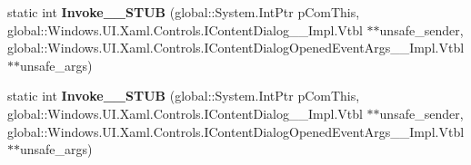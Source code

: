 \begin{DoxyCompactItemize}
\mbox{\label{struct_windows_1_1_foundation_1_1_typed_event_handler___a___windows___u_i___xaml___controls___co7eff74cfd44b375ec88a14fae1c258be_aa06d401f175726b3933a91c4a9d22514}} 
static int {\bfseries Invoke\+\_\+\+\_\+\+S\+T\+UB} (global\+::\+System.\+Int\+Ptr p\+Com\+This, global\+::\+Windows.\+U\+I.\+Xaml.\+Controls.\+I\+Content\+Dialog\+\_\+\+\_\+\+Impl.\+Vtbl $\ast$$\ast$unsafe\+\_\+sender, global\+::\+Windows.\+U\+I.\+Xaml.\+Controls.\+I\+Content\+Dialog\+Opened\+Event\+Args\+\_\+\+\_\+\+Impl.\+Vtbl $\ast$$\ast$unsafe\+\_\+args)
\item 
\mbox{\label{struct_windows_1_1_foundation_1_1_typed_event_handler___a___windows___u_i___xaml___controls___co7eff74cfd44b375ec88a14fae1c258be_aa06d401f175726b3933a91c4a9d22514}} 
static int {\bfseries Invoke\+\_\+\+\_\+\+S\+T\+UB} (global\+::\+System.\+Int\+Ptr p\+Com\+This, global\+::\+Windows.\+U\+I.\+Xaml.\+Controls.\+I\+Content\+Dialog\+\_\+\+\_\+\+Impl.\+Vtbl $\ast$$\ast$unsafe\+\_\+sender, global\+::\+Windows.\+U\+I.\+Xaml.\+Controls.\+I\+Content\+Dialog\+Opened\+Event\+Args\+\_\+\+\_\+\+Impl.\+Vtbl $\ast$$\ast$unsafe\+\_\+args)
\end{DoxyCompactItemize}
